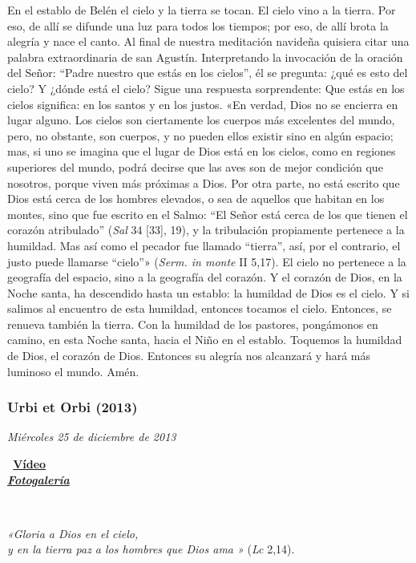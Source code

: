 En el establo de Belén el cielo y la tierra se tocan. El cielo vino a la
tierra. Por eso, de allí se difunde una luz para todos los tiempos; por
eso, de allí brota la alegría y nace el canto. Al final de nuestra
meditación navideña quisiera citar una palabra extraordinaria de san
Agustín. Interpretando la invocación de la oración del Señor: ``Padre
nuestro que estás en los cielos'', él se pregunta: ¿qué es esto del
cielo? Y ¿dónde está el cielo? Sigue una respuesta sorprendente: Que
estás en los cielos significa: en los santos y en los justos. «En
verdad, Dios no se encierra en lugar alguno. Los cielos son ciertamente
los cuerpos más excelentes del mundo, pero, no obstante, son cuerpos, y
no pueden ellos existir sino en algún espacio; mas, si uno se imagina
que el lugar de Dios está en los cielos, como en regiones superiores del
mundo, podrá decirse que las aves son de mejor condición que nosotros,
porque viven más próximas a Dios. Por otra parte, no está escrito que
Dios está cerca de los hombres elevados, o sea de aquellos que habitan
en los montes, sino que fue escrito en el Salmo: ``El Señor está cerca
de los que tienen el corazón atribulado'' (\emph{Sal} 34 {[}33{]}, 19),
y la tribulación propiamente pertenece a la humildad. Mas así como el
pecador fue llamado ``tierra'', así, por el contrario, el justo puede
llamarse ``cielo''» (\emph{Serm. in monte} II 5,17). El cielo no
pertenece a la geografía del espacio, sino a la geografía del corazón. Y
el corazón de Dios, en la Noche santa, ha descendido hasta un establo:
la humildad de Dios es el cielo. Y si salimos al encuentro de esta
humildad, entonces tocamos el cielo. Entonces, se renueva también la
tierra. Con la humildad de los pastores, pongámonos en camino, en esta
Noche santa, hacia el Niño en el establo. Toquemos la humildad de Dios,
el corazón de Dios. Entonces su alegría nos alcanzará y hará más
luminoso el mundo. Amén.

\subsubsection{Urbi et Orbi (2013)}
\emph{Miércoles 25 de diciembre de 2013}

\emph{~}\textbf{\href{http://player.rv.va/vaticanplayer.asp?language=it\&tic=VA_HQ73WTGW}{Vídeo}}\\
\emph{\textbf{\href{http://www.photogallery.va/content/photogallery/es/celebrazioni-liturgiche/urbi-natale2013.html}{Fotogalería}}}

~

\emph{«Gloria a Dios en el cielo,\\
	y en la tierra paz a los hombres que Dios ama »} (\emph{Lc} 2,14).

